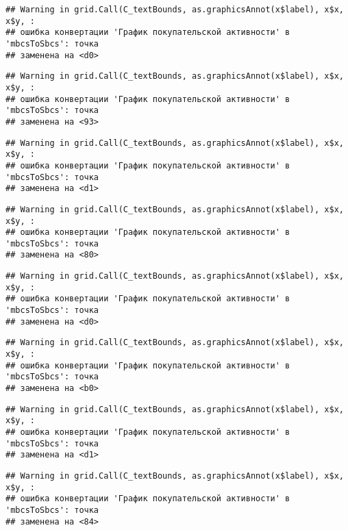 \documentclass[
]{article}
\begin{document}
\begin{verbatim}
## Warning in grid.Call(C_textBounds, as.graphicsAnnot(x$label), x$x, x$y, :
## ошибка конвертации 'График покупательской активности' в 'mbcsToSbcs': точка
## заменена на <d0>
\end{verbatim}

\begin{verbatim}
## Warning in grid.Call(C_textBounds, as.graphicsAnnot(x$label), x$x, x$y, :
## ошибка конвертации 'График покупательской активности' в 'mbcsToSbcs': точка
## заменена на <93>
\end{verbatim}

\begin{verbatim}
## Warning in grid.Call(C_textBounds, as.graphicsAnnot(x$label), x$x, x$y, :
## ошибка конвертации 'График покупательской активности' в 'mbcsToSbcs': точка
## заменена на <d1>
\end{verbatim}

\begin{verbatim}
## Warning in grid.Call(C_textBounds, as.graphicsAnnot(x$label), x$x, x$y, :
## ошибка конвертации 'График покупательской активности' в 'mbcsToSbcs': точка
## заменена на <80>
\end{verbatim}

\begin{verbatim}
## Warning in grid.Call(C_textBounds, as.graphicsAnnot(x$label), x$x, x$y, :
## ошибка конвертации 'График покупательской активности' в 'mbcsToSbcs': точка
## заменена на <d0>
\end{verbatim}

\begin{verbatim}
## Warning in grid.Call(C_textBounds, as.graphicsAnnot(x$label), x$x, x$y, :
## ошибка конвертации 'График покупательской активности' в 'mbcsToSbcs': точка
## заменена на <b0>
\end{verbatim}

\begin{verbatim}
## Warning in grid.Call(C_textBounds, as.graphicsAnnot(x$label), x$x, x$y, :
## ошибка конвертации 'График покупательской активности' в 'mbcsToSbcs': точка
## заменена на <d1>
\end{verbatim}

\begin{verbatim}
## Warning in grid.Call(C_textBounds, as.graphicsAnnot(x$label), x$x, x$y, :
## ошибка конвертации 'График покупательской активности' в 'mbcsToSbcs': точка
## заменена на <84>
\end{verbatim}
\end{document}
